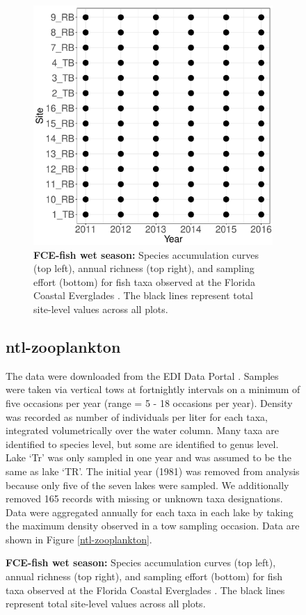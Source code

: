 \documentclass[11pt, oneside]{article}
\begin{document}
\begin{figure}[h!]
\begin{figure}[h!]
\includegraphics[scale = 0.4]{fce-fish-RehageWet_spatiotemporal_sampling_effort.pdf}
\caption{{\bf FCE-fish wet season:} Species accumulation curves (top left),  annual richness (top right), and sampling effort (bottom)  for fish taxa observed at the Florida Coastal Everglades . The black lines represent total site-level values across all plots.}
\label{fce-fish-wet}
\end{figure}



\newpage
\subsection {ntl-zooplankton}
The data were downloaded from the EDI Data Portal \citep{ntl-zooplankton}.
Samples were taken  via vertical tows at fortnightly intervals on a minimum of five occasions per year (range = 5 - 18 occasions per year).
Density was recorded as number of individuals per liter for each taxa, integrated volumetrically over the water column.
Many taxa are identified to species level, but some are identified to genus level.
Lake `Tr'  was only sampled in one year and was assumed to be the same as lake `TR'. %
The initial year (1981) was removed from analysis because only five of the seven lakes were sampled.
We additionally removed 165 records with missing or unknown taxa designations.
Data were aggregated annually for each taxa in each lake by taking the maximum density observed in a tow sampling occasion.
Data are shown in Figure \ref{ntl-zooplankton}.


\end{figure}
\end{document}
